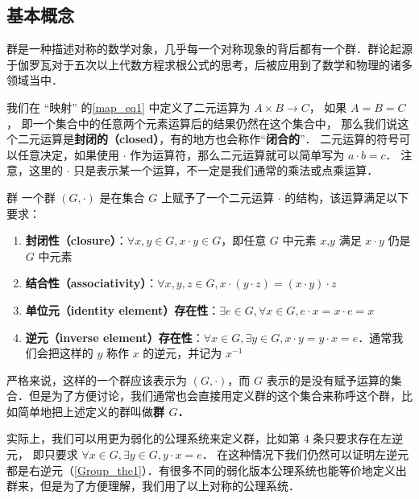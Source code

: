 

\subsection{基本概念}
群是一种描述对称的数学对象，几乎每一个对称现象的背后都有一个群．群论起源于伽罗瓦对于五次以上代数方程求根公式的思考，后被应用到了数学和物理的诸多领域当中．

我们在 “映射” 的\autoref{map_eq1} 中定义了二元运算为 $A \times B \to C$， 如果 $A = B = C$， 即一个集合中的任意两个元素运算后的结果仍然在这个集合中， 那么我们说这个二元运算是\textbf{封闭的（closed）}，有的地方也会称作“\textbf{闭合的}”． 二元运算的符号可以任意决定，如果使用 $\cdot$ 作为运算符，那么二元运算就可以简单写为 $a \cdot b=c$． 注意，这里的 $\cdot$ 只是表示某一个运算，不一定是我们通常的乘法或点乘运算．

\begin{definition}{群}\label{Group_def1}
一个群 $(G, \cdot)$ 是在集合 $G$ 上赋予了一个二元运算 $\cdot$ 的结构，该运算满足以下要求：
\begin{enumerate}
\item \textbf{封闭性（closure）}：$\forall x, y\in G, x\cdot y\in G$，即任意 $G$ 中元素 $x$,$y$ 满足 $x\cdot y$ 仍是 $G$ 中元素
\item \textbf{结合性（associativity）}：$\forall x, y, z\in G, x\cdot(y\cdot z)=(x\cdot y)\cdot z$
\item \textbf{单位元（identity element）存在性}：$\exists e\in G, \forall x\in G, e\cdot x=x\cdot e=x$
\item \textbf{逆元（inverse element）存在性}：$\forall x\in G, \exists y\in G, x\cdot y=y\cdot x=e$．通常我们会把这样的 $y$ 称作 $x$ 的逆元，并记为 $x^{-1}$
\end{enumerate}
\end{definition}
严格来说，这样的一个群应该表示为 $(G,\cdot)$，而 $G$ 表示的是没有赋予运算的集合．但是为了方便讨论，我们通常也会直接用定义群的这个集合来称呼这个群，比如简单地把上述定义的群叫做\textbf{群 $G$．}

实际上，我们可以用更为弱化的公理系统来定义群，比如第 4 条只要求存在左逆元， 即只要求 $\forall x\in G, \exists y\in G, y\cdot x=e$． 在这种情况下我们仍然可以证明左逆元都是右逆元（\autoref{Group_the1}）．有很多不同的弱化版本公理系统也能等价地定义出群来，但是为了方便理解，我们用了以上对称的公理系统．

